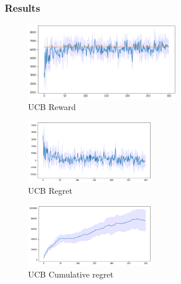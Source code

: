 \subsubsection{Results}
\begin{figure}[ht]
    \begin{center}
    \includegraphics[width=0.6\textwidth]{img/UCB4.png}
    \caption{UCB Reward}
    \label{fig:reward41}
    \end{center}
\end{figure}
\begin{multicols}{2}
    \begin{figure}[H]
        \begin{center}
        \includegraphics[width=0.5\textwidth]{img/UCB4_regret.png}
        \caption{UCB Regret}
        \label{fig:regret41}
        \end{center}
    \end{figure}
    \columnbreak
    \begin{figure}[H]
        \begin{center}
        \includegraphics[width=0.5\textwidth]{img/UCB4_cum_reg.png}
        \caption{UCB Cumulative regret}
        \label{fig:cum_reg41}
        \end{center}
    \end{figure}
\end{multicols}

